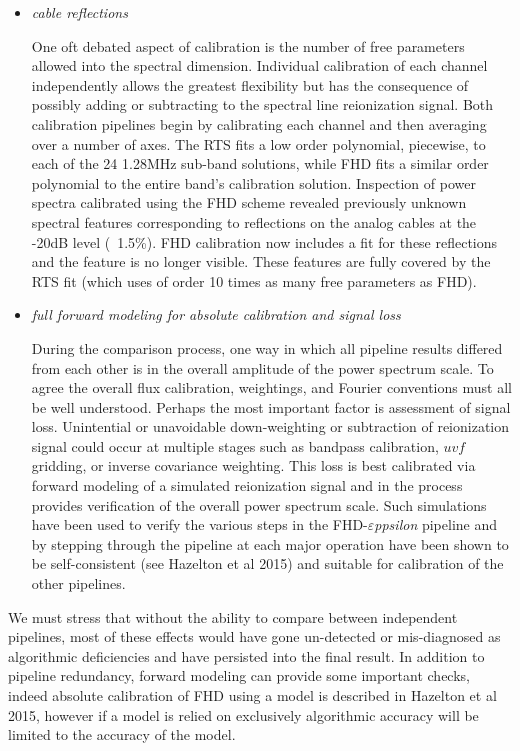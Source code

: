 \documentclass[preprint2]{aastex}
\def\eppsilon{{\it $\varepsilon$ppsilon}}
\def\eppsiloncite{Hazelton et al 2015}
\begin{document}
\begin{itemize}

\item \emph{ cable reflections}

One oft debated aspect of calibration is the number of free parameters allowed into the spectral dimension. Individual calibration of each channel independently allows the greatest flexibility but has the consequence of possibly adding or subtracting to the spectral line reionization signal.  Both calibration pipelines begin by calibrating each channel and then averaging over a number of axes.  The RTS fits a low order polynomial, piecewise, to each of the 24 1.28MHz sub-band solutions, while FHD fits a similar order polynomial to the entire  band's calibration solution.  Inspection of power spectra calibrated using the FHD scheme revealed  previously unknown spectral features corresponding to reflections on the analog cables at the -20dB level (~1.5\%). FHD calibration now includes a fit for these reflections and the feature is no longer visible. These features are fully covered by the RTS fit (which uses of order 10 times as many free parameters as FHD).

\item \emph{full forward modeling for absolute calibration and signal loss}

During the comparison process, one way in which all pipeline results differed from each other is in the overall amplitude of the power spectrum scale. To agree the overall flux calibration, weightings, and Fourier conventions must all be well understood.  Perhaps the most important factor is assessment of signal loss.  Unintential or unavoidable down-weighting or subtraction of reionization signal could occur at multiple stages such as bandpass calibration, $uvf$ gridding, or inverse covariance weighting. This loss is best calibrated via forward modeling of a simulated reionization signal and in the process provides verification of the overall power spectrum scale.  Such simulations have been used to verify the various steps in the FHD-\eppsilon{} pipeline and by stepping through the pipeline at each major operation have been shown to be self-consistent (see \eppsiloncite{}) and suitable for calibration of the other pipelines.
\end{itemize}

  We must stress that without the ability to compare between independent pipelines, most of these effects would have gone un-detected or mis-diagnosed as algorithmic deficiencies and have persisted into the final result. In addition to pipeline redundancy, forward modeling can provide some important checks, indeed absolute calibration of FHD using a model is described in \eppsiloncite{}, however if a model is relied on exclusively algorithmic accuracy will be limited to the accuracy of the model.
\end{document}
